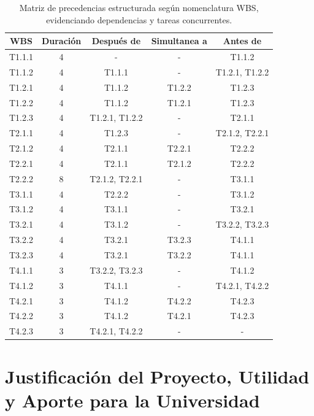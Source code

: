 \begin{table}[htb]
	\centering	
	\begin{tabular}{|c|c|c|c|c|}\hline
		\textbf{WBS}&\textbf{Duración} &\textbf{Después de} & \textbf{Simultanea a} & \textbf{Antes de}\\\hline
		T1.1.1 & 4 & - & - & T1.1.2 \\\hline
		T1.1.2 & 4 & T1.1.1 & - & T1.2.1, T1.2.2 \\\hline
		T1.2.1 & 4 & T1.1.2 & T1.2.2 & T1.2.3 \\\hline
		T1.2.2 & 4 & T1.1.2 & T1.2.1 & T1.2.3 \\\hline
		T1.2.3 & 4 & T1.2.1, T1.2.2 & - & T2.1.1 \\\hline
		T2.1.1 & 4 & T1.2.3 & - & T2.1.2, T2.2.1 \\\hline
		T2.1.2 & 4 & T2.1.1 & T2.2.1 & T2.2.2 \\\hline
		T2.2.1 & 4 & T2.1.1 & T2.1.2 & T2.2.2 \\\hline
		T2.2.2 & 8 & T2.1.2, T2.2.1 & - & T3.1.1 \\\hline
		T3.1.1 & 4 & T2.2.2 & - & T3.1.2 \\\hline
		T3.1.2 & 4 & T3.1.1 & - & T3.2.1 \\\hline
		T3.2.1 & 4 & T3.1.2 & - & T3.2.2, T3.2.3 \\\hline
		T3.2.2 & 4 & T3.2.1 & T3.2.3 & T4.1.1 \\\hline
		T3.2.3 & 4 & T3.2.1 & T3.2.2 & T4.1.1 \\\hline
		T4.1.1 & 3 & T3.2.2, T3.2.3 & - & T4.1.2 \\\hline
		T4.1.2 & 3 & T4.1.1 & - & T4.2.1, T4.2.2 \\\hline
		T4.2.1 & 3 & T4.1.2 & T4.2.2 & T4.2.3 \\\hline
		T4.2.2 & 3 & T4.1.2 & T4.2.1 & T4.2.3 \\\hline
		T4.2.3 & 3 & T4.2.1, T4.2.2 & - & - \\\hline
	\end{tabular}
	\caption{Matriz de precedencias estructurada según nomenclatura WBS, evidenciando dependencias y tareas concurrentes.}
	\label{t:precedencia_wbs}	
\end{table}
 

 
\section[Justificación y Aporte]{Justificación del Proyecto, Utilidad y Aporte para la Universidad}

